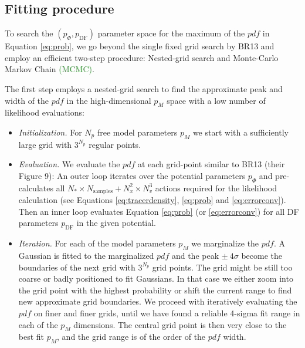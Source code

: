 \documentclass[iop,revtex4]{emulateapj}
\newcommand{\pdf}{\ensuremath{pdf}}
\newcommand{\pmodel}{\ensuremath{p_M}}
\newcommand{\NEW}[1]{\textcolor{ForestGreen}{#1}}
\begin{document}
\subsection{Fitting procedure} \label{sec:fitting}

To search the $(p_\Phi,p_\text{DF})$ parameter space for the maximum of the \pdf{} in Equation \eqref{eq:prob}, we go beyond the single fixed grid search by BR13 and employ an efficient two-step procedure: Nested-grid search and Monte-Carlo Markov Chain \NEW{(MCMC)}.

The first step employs a nested-grid search to find the approximate peak and width of the \pdf{} in the high-dimensional \pmodel{}  space with a low number of likelihood evaluations:

\begin{itemize}
\item \emph{Initialization.} For $N_p$ free model parameters \pmodel{} we start with a sufficiently large grid with $3^{N_p}$ regular points.

\item  \emph{Evaluation.} We evaluate the \pdf{} at each grid-point similar to BR13 (their Figure 9):  An outer loop iterates over the potential parameters $p_\Phi$ and pre-calculates all $N_* \times N_\text{samples} + N_x^2 \times N_v^3$ actions required for the likelihood calculation (see Equations \eqref{eq:tracerdensity}, \eqref{eq:prob} and \eqref{eq:errorconv}). Then an inner loop evaluates Equation \eqref{eq:prob} (or \eqref{eq:errorconv}) for all DF parameters $p_\text{DF}$ in the given potential.

\item \emph{Iteration.} For each of the model parameters \pmodel{} we marginalize the \pdf{}. A Gaussian is fitted to the marginalized \pdf{} and the peak $\pm ~ 4\sigma$ become the boundaries of the next grid with $3^{N_p}$ grid points. The grid might be still too coarse or badly positioned to fit Gaussians. In that case we either zoom into the grid point with the highest probability or shift the current range to find new approximate grid boundaries. We proceed with iteratively evaluating the \pdf{} on finer and finer grids, until we have found a reliable 4-sigma fit range in each of the \pmodel{} dimensions. The central grid point is then very close to the best fit \pmodel{}, and the grid range is of the order of the \pdf{} width.


\end{itemize}
\end{document}
